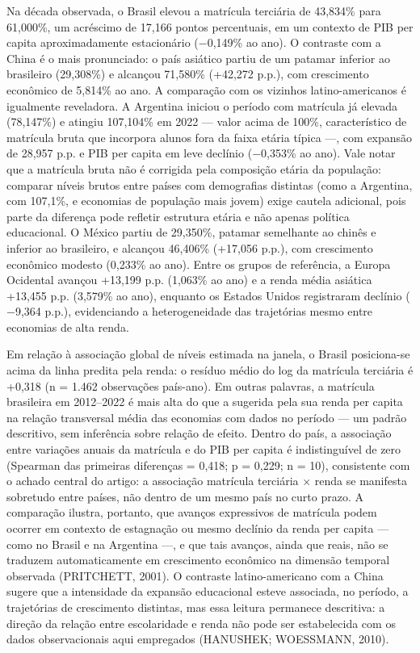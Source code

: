 \documentclass[12pt,a4paper]{article}
\begin{document}
Na década observada, o Brasil elevou a matrícula terciária de 43,834\% para 61,000\%, um acréscimo de 17,166 pontos percentuais, em um contexto de PIB per capita aproximadamente estacionário ($-$0,149\% ao ano). O contraste com a China é o mais pronunciado: o país asiático partiu de um patamar inferior ao brasileiro (29,308\%) e alcançou 71,580\% (+42,272 p.p.), com crescimento econômico de 5,814\% ao ano. A comparação com os vizinhos latino-americanos é igualmente reveladora. A Argentina iniciou o período com matrícula já elevada (78,147\%) e atingiu 107,104\% em 2022 --- valor acima de 100\%, característico de matrícula bruta que incorpora alunos fora da faixa etária típica ---, com expansão de 28,957 p.p. e PIB per capita em leve declínio ($-$0,353\% ao ano). Vale notar que a matrícula bruta não é corrigida pela composição etária da população: comparar níveis brutos entre países com demografias distintas (como a Argentina, com 107,1\%, e economias de população mais jovem) exige cautela adicional, pois parte da diferença pode refletir estrutura etária e não apenas política educacional. O México partiu de 29,350\%, patamar semelhante ao chinês e inferior ao brasileiro, e alcançou 46,406\% (+17,056 p.p.), com crescimento econômico modesto (0,233\% ao ano). Entre os grupos de referência, a Europa Ocidental avançou +13,199 p.p. (1,063\% ao ano) e a renda média asiática +13,455 p.p. (3,579\% ao ano), enquanto os Estados Unidos registraram declínio ($-$9,364 p.p.), evidenciando a heterogeneidade das trajetórias mesmo entre economias de alta renda.

Em relação à associação global de níveis estimada na janela, o Brasil posiciona-se acima da linha predita pela renda: o resíduo médio do log da matrícula terciária é +0,318 (n = 1.462 observações país-ano). Em outras palavras, a matrícula brasileira em 2012--2022 é mais alta do que a sugerida pela sua renda per capita na relação transversal média das economias com dados no período --- um padrão descritivo, sem inferência sobre relação de efeito. Dentro do país, a associação entre variações anuais da matrícula e do PIB per capita é indistinguível de zero (Spearman das primeiras diferenças = 0,418; p = 0,229; n = 10), consistente com o achado central do artigo: a associação matrícula terciária $\times$ renda se manifesta sobretudo entre países, não dentro de um mesmo país no curto prazo. A comparação ilustra, portanto, que avanços expressivos de matrícula podem ocorrer em contexto de estagnação ou mesmo declínio da renda per capita --- como no Brasil e na Argentina ---, e que tais avanços, ainda que reais, não se traduzem automaticamente em crescimento econômico na dimensão temporal observada (PRITCHETT, 2001). O contraste latino-americano com a China sugere que a intensidade da expansão educacional esteve associada, no período, a trajetórias de crescimento distintas, mas essa leitura permanece descritiva: a direção da relação entre escolaridade e renda não pode ser estabelecida com os dados observacionais aqui empregados (HANUSHEK; WOESSMANN, 2010).
\end{document}
